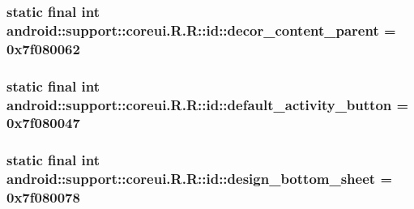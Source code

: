 \hypertarget{classandroid_1_1support_1_1coreui_1_1_r_1_1id_41548df2a33205923d82b45a0a8135ce}{
\subsubsection[{decor\_\-content\_\-parent}]{\setlength{\rightskip}{0pt plus 5cm}static final int android::support::coreui.R.R::id::decor\_\-content\_\-parent = 0x7f080062}}
\label{classandroid_1_1support_1_1coreui_1_1_r_1_1id_41548df2a33205923d82b45a0a8135ce}


\hypertarget{classandroid_1_1support_1_1coreui_1_1_r_1_1id_4e5afa71333f33281df16b00828bc1b7}{
\subsubsection[{default\_\-activity\_\-button}]{\setlength{\rightskip}{0pt plus 5cm}static final int android::support::coreui.R.R::id::default\_\-activity\_\-button = 0x7f080047}}
\label{classandroid_1_1support_1_1coreui_1_1_r_1_1id_4e5afa71333f33281df16b00828bc1b7}


\hypertarget{classandroid_1_1support_1_1coreui_1_1_r_1_1id_212798326d1da146a8fd298eb5a367fe}{
\subsubsection[{design\_\-bottom\_\-sheet}]{\setlength{\rightskip}{0pt plus 5cm}static final int android::support::coreui.R.R::id::design\_\-bottom\_\-sheet = 0x7f080078}}
\label{classandroid_1_1support_1_1coreui_1_1_r_1_1id_212798326d1da146a8fd298eb5a367fe}


